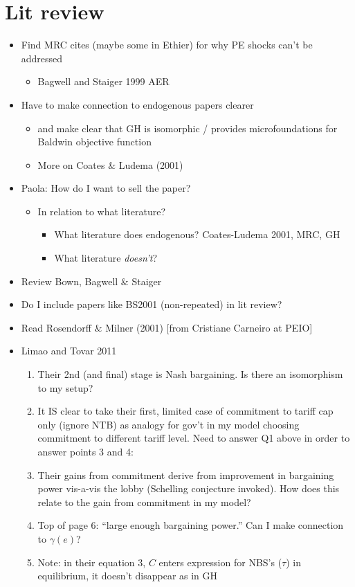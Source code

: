 \documentclass[12pt]{article}
\newcommand{\ga}{\gamma}
\begin{document}
\section{Lit review}
\begin{itemize}
	\item Find MRC cites (maybe some in Ethier) for why PE shocks can't be addressed
		\begin{itemize}
			\item Bagwell and Staiger 1999 AER
		\end{itemize}
	\item Have to make connection to endogenous papers clearer
		\begin{itemize}
			\item and make clear that GH is isomorphic / provides microfoundations for Baldwin objective function
			\item More on Coates $\&$ Ludema (2001)
		\end{itemize}
	\item Paola: How do I want to sell the paper?
		\begin{itemize}
			\item In relation to what literature?
				\begin{itemize}
					\item What literature does endogenous? Coates-Ludema 2001, MRC, GH
					\item What literature \textit{doesn't}?
				\end{itemize}
			\end{itemize}
	\item Review Bown, Bagwell $\&$ Staiger
	\item Do I include papers like BS2001 (non-repeated) in lit review?
	\item Read Rosendorff $\&$ Milner (2001) [from Cristiane Carneiro at PEIO]
	\item Limao and Tovar 2011
		\begin{enumerate}
			\item Their 2nd (and final) stage is Nash bargaining. Is there an isomorphism to my setup?
			\item It IS clear to take their first, limited case of commitment to tariff cap only (ignore NTB) as analogy for gov't in my model choosing commitment to different tariff level. Need to answer Q1 above in order to answer points 3 and 4:
			\item Their gains from commitment derive from improvement in bargaining power vis-a-vis the lobby (Schelling conjecture invoked). How does this relate to the gain from commitment in my model?
			\item Top of page 6: ``large enough bargaining power.'' Can I make connection to $\ga(e)$?
			\item Note: in their equation 3, $C$ enters expression for NBS's ($\tau$) in equilibrium, it doesn't disappear as in GH
		\end{enumerate}
\end{itemize}
\end{document}
